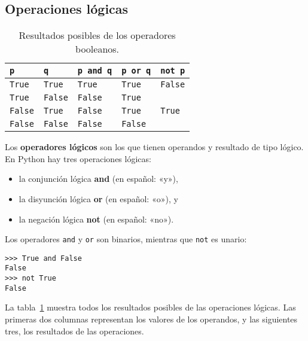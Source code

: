 \subsection{Operaciones lógicas}

\begin{table}
  \centering
  \begin{tabular}{*{5}{l}}
    \toprule
      \lstinline!p!     & \lstinline!q!       & \lstinline!p and q! & \lstinline!p or q! & \lstinline!not p! \\
    \midrule
      \lstinline!True!  & \lstinline!True!    & \lstinline!True!    & \lstinline!True!   & \lstinline!False! \\
      \lstinline!True!  & \lstinline!False!   & \lstinline!False!   & \lstinline!True!   &                   \\
      \lstinline!False! & \lstinline!True!    & \lstinline!False!   & \lstinline!True!   & \lstinline!True!  \\
      \lstinline!False! & \lstinline!False!   & \lstinline!False!   & \lstinline!False!  &                   \\
    \bottomrule
  \end{tabular}
  \caption{Resultados posibles de los operadores booleanos.}
  \label{tbl:operadores-booleanos}
\end{table}

Los \textbf{operadores lógicos} son los que tienen operandos y resultado
de tipo lógico.
En Python hay tres operaciones lógicas:

\begin{itemize}
 \item la conjunción lógica \textbf{and} (en español: «y»),
 \item la disyunción lógica \textbf{or} (en español: «o»), y
 \item la negación lógica \textbf{not} (en español: «no»).
\end{itemize}

Los operadores \lstinline!and! y \lstinline!or! son binarios, mientras
que \lstinline!not! es unario:
\begin{lstlisting}
>>> True and False
False
>>> not True
False
\end{lstlisting}

La tabla~\ref{tbl:operadores-booleanos} muestra todos los resultados posibles de las
operaciones lógicas. Las primeras dos columnas representan los valores
de los operandos, y las siguientes tres, los resultados de las
operaciones.

